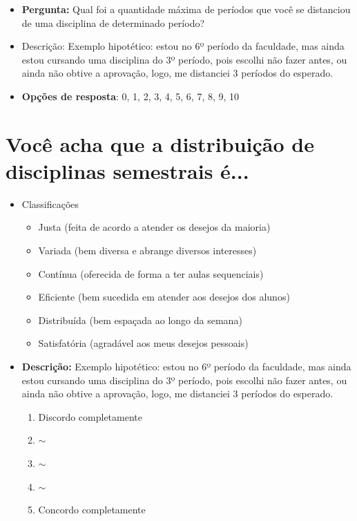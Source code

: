 \begin{apendicesenv}
  \begin{itemize}
    \item \textbf{Pergunta:} Qual foi a quantidade máxima de períodos que você se distanciou de uma disciplina de determinado período?
    \item Descrição: Exemplo hipotético: estou no 6º período da faculdade, mas ainda estou cursando uma disciplina do 3º período, pois escolhi não fazer antes, ou ainda não obtive a aprovação, logo, me distanciei 3 períodos do esperado.
    \item \textbf{Opções de resposta}: 0, 1, 2, 3, 4, 5, 6, 7, 8, 9, 10
  \end{itemize}

  \section*{Você acha que a distribuição de disciplinas semestrais é...}

  \begin{itemize}
    \item Classificações
          \begin{itemize}
            \item Justa (feita de acordo a atender os desejos da maioria)
            \item Variada (bem diversa e abrange diversos interesses)
            \item Contínua (oferecida de forma a ter aulas sequenciais)
            \item Eficiente (bem sucedida em atender aos desejos dos alunos)
            \item Distribuída (bem espaçada ao longo da semana)
            \item Satisfatória (agradável aos meus desejos pessoais)
          \end{itemize}
    \item \textbf{Descrição:} Exemplo hipotético: estou no 6º período da faculdade, mas ainda estou cursando uma disciplina do 3º período, pois escolhi não fazer antes, ou ainda não obtive a aprovação, logo, me distanciei 3 períodos do esperado.
          \begin{enumerate}
            \item Discordo completamente
            \item $\sim$
            \item $\sim$
            \item $\sim$
            \item Concordo completamente
          \end{enumerate}
  \end{itemize}


\end{apendicesenv}
